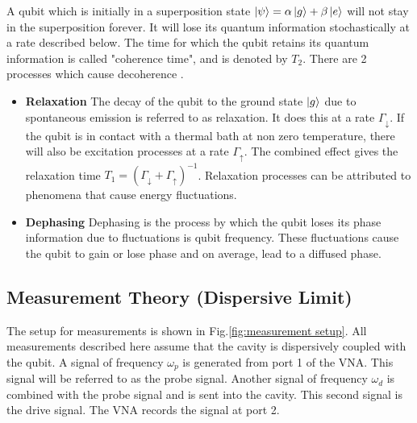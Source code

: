 A qubit which is initially in a superposition state $\ket{\psi} = \alpha\ket{g}+\beta\ket{e}$ will not stay in the superposition forever. It will lose its quantum information stochastically at a rate described below. The time for which the qubit retains its quantum information is called "coherence time", and is denoted by $T_2$. There are 2 processes which cause decoherence \cite{Geerlings2013}.
\begin{itemize}
\item \textbf{Relaxation}
The decay of the qubit to the ground state $\ket{g}$ due to spontaneous emission is referred to as relaxation. It does this at a rate $\Gamma_{\downarrow}$. If the qubit is in contact with a thermal bath at non zero temperature, there will also be excitation processes at a rate $\Gamma_{\uparrow}$. The combined effect gives the relaxation time $T_1 = \left(\Gamma_{\downarrow}+\Gamma_{\uparrow}\right)^{-1}$. Relaxation processes can be attributed to phenomena that cause energy fluctuations.
\item \textbf{Dephasing}
Dephasing is the process by which the qubit loses its phase information due to fluctuations is qubit frequency. These fluctuations cause the qubit to gain or lose phase and on average, lead to a diffused phase.
\end{itemize}

\subsection{Measurement Theory (Dispersive Limit)}

The setup for measurements is shown in Fig.\ref{fig:measurement setup}. All measurements described here assume that the cavity is dispersively coupled with the qubit. A signal of frequency $\omega_p$ is generated from port 1 of the VNA. This signal will be referred to as the probe signal. Another signal of frequency $\omega_d$ is combined with the probe signal and is sent into the cavity. This second signal is the drive signal. The VNA records the signal at port 2.

